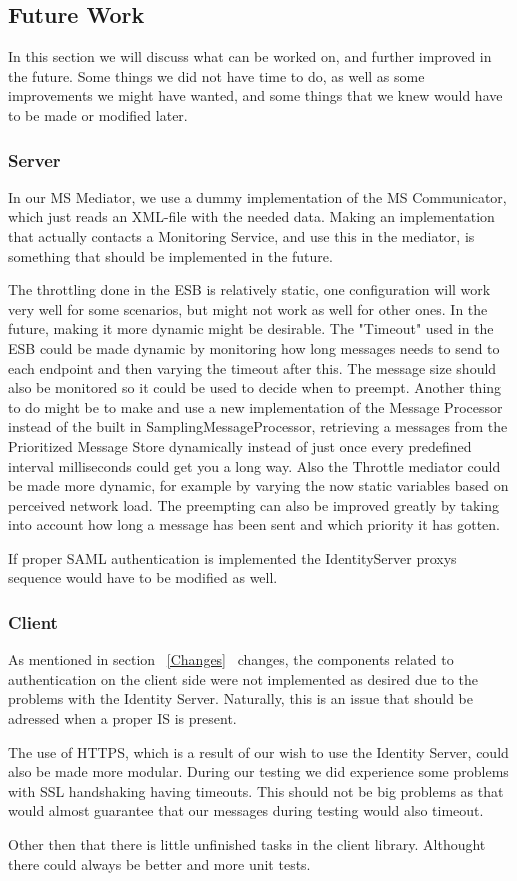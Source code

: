 \subsection{Future Work}\label{Future Work}
    In this section we will discuss what can be worked on, and further improved in the future. Some things we did not have time to do, as well as some improvements we might have wanted, and some things that we knew would have to be made or modified later.

    \subsubsection{Server}\label{Future:Server}
        In our MS Mediator, we use a dummy implementation of the MS Communicator, which just reads an XML-file with the needed data. Making an implementation that actually contacts a Monitoring Service, and use this in the mediator, is something that should be implemented in the future.

        The throttling done in the ESB is relatively static, one configuration will work very well for some scenarios, but might not work as well for other ones. In the future, making it more dynamic might be desirable. The "Timeout" used in the ESB could be made dynamic by monitoring how long messages needs to send to each endpoint and then varying the timeout after this. The message size should also be monitored so it could be used to decide when to preempt. Another thing to do might be to make and use a new implementation of the Message Processor instead of the built in SamplingMessageProcessor, retrieving a messages from the Prioritized Message Store dynamically instead of just once every predefined interval milliseconds could get you a long way. Also the Throttle mediator could be made more dynamic, for example by varying the now static variables based on perceived network load. The preempting can also be improved greatly by taking into account how long a message has been sent and which priority it has 
gotten.

        If proper SAML authentication is implemented the IdentityServer proxys sequence would have to be modified as well.

	\subsubsection{Client}\label{Future:Client}
		As mentioned in section ~\ref{Changes} ~changes, the components related to authentication on the client side were not implemented as desired due to the problems with the Identity Server. Naturally, this is an issue that should be adressed when a proper IS is present.

		The use of HTTPS, which is a result of our wish to use the Identity Server, could also be made more modular. During our testing we did experience some problems with SSL handshaking having timeouts. This should not be big problems as that would almost guarantee that our messages during testing would also timeout.
		
    	Other then that there is little unfinished tasks in the client library. Althought there could always be better and more unit tests. 

